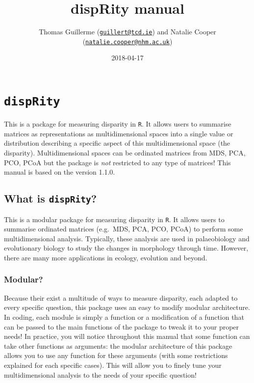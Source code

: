 \documentclass[]{book}
\title{dispRity manual}
\author{Thomas Guillerme
(\href{mailto:guillert@tcd.ie}{\nolinkurl{guillert@tcd.ie}}) and Natalie
Cooper
(\href{mailto:natalie.cooper@nhm.ac.uk}{\nolinkurl{natalie.cooper@nhm.ac.uk}})}
\date{2018-04-17}
\theoremstyle{definition}
\theoremstyle{definition}
\theoremstyle{remark}
\begin{document}
\maketitle

{
\setcounter{tocdepth}{1}
\tableofcontents
}
\chapter{\texorpdfstring{\texttt{dispRity}}{dispRity}}\label{disprity}

This is a package for measuring disparity in \texttt{R}. It allows users
to summarise matrices as representations as multidimensional spaces into
a single value or distribution describing a specific aspect of this
multidimensional space (the disparity). Multidimensional spaces can be
ordinated matrices from MDS, PCA, PCO, PCoA but the package is
\emph{not} restricted to any type of matrices! This manual is based on
the version 1.1.0.

\section{\texorpdfstring{What is
\texttt{dispRity}?}{What is dispRity?}}\label{what-is-disprity}

This is a modular package for measuring disparity in \texttt{R}. It
allows users to summarise ordinated matrices (e.g.~MDS, PCA, PCO, PCoA)
to perform some multidimensional analysis. Typically, these analysis are
used in palaeobiology and evolutionary biology to study the changes in
morphology through time. However, there are many more applications in
ecology, evolution and beyond.

\subsection{Modular?}\label{modular}

Because their exist a multitude of ways to measure disparity, each
adapted to every specific question, this package uses an easy to modify
modular architecture. In coding, each module is simply a function or a
modification of a function that can be passed to the main functions of
the package to tweak it to your proper needs! In practice, you will
notice throughout this manual that some function can take other
functions as arguments: the modular architecture of this package allows
you to use any function for these arguments (with some restrictions
explained for each specific cases). This will allow you to finely tune
your multidimensional analysis to the needs of your specific question!
\end{document}

